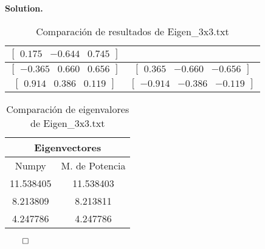 \documentclass{article}
\theoremstyle{problemstyle}
\newenvironment{solution}{%
  \begin{mdframed}[linewidth=0.8pt,linecolor=Gray,backgroundcolor=Gray!5,roundcorner=5pt]%
  \noindent\textbf{Solution.}%
}{%
\hfill $ \qed $ 
  \end{mdframed}%
}
\begin{document}
\begin{solution}
\begin{enumerate}
\begin{table}[H]
\begin{center}
\begin{tabular}{|c|c|}
					      $ \begin{bmatrix}
							        0.175 & -0.644 & 0.745
						        \end{bmatrix} $                        \\
					      [0.5em]
					      \hline
					      \rule{0pt}{1.5em}
					      $ \begin{bmatrix}
							        -0.365 & 0.660 & 0.656
						        \end{bmatrix} $ & $ \begin{bmatrix}
							                            0.365 & -0.660 & -0.656
						                            \end{bmatrix} $   \\
					      [0.5em]
					      \hline
					      \rule{0pt}{1.5em}
					      $ \begin{bmatrix}
							        0.914 & 0.386 & 0.119
						        \end{bmatrix} $  & $ \begin{bmatrix}
							                             -0.914 & -0.386 & -0.119
						                             \end{bmatrix} $ \\
					      [0.5em]
					      \hline
				      \end{tabular}

			      \end{center}
			      \caption{Comparaci\'on de resultados de Eigen\_3x3.txt}\label{tab:aevecs3x3}
		      \end{table}

		      \begin{table}[H]
			      \begin{center}
				      \begin{tabular}{|c|c|}
					      \multicolumn{2}{c}{Eigenvectores} \\
					      \hline
					      Numpy     & M. de Potencia        \\
					      \hline
					      \rule{0pt}{1.5em}
					      11.538405 & 11.538403             \\
					      [0.5em]
					      \hline
					      \rule{0pt}{1.5em}
					      8.213809  & 8.213811              \\
					      [0.5em]
					      \hline
					      \rule{0pt}{1.5em}
					      4.247786  & 4.247786              \\
					      [0.5em]
					      \hline
				      \end{tabular}
			      \end{center}
			      \caption{Comparaci\'on de eigenvalores de Eigen\_3x3.txt}\label{tab:evals3x3}
		      \end{table}


\end{enumerate}
\end{solution}
\end{document}
